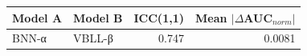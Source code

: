 \begin{tabular}{llrr}
\toprule
\textbf{Model A} & \textbf{Model B} & \textbf{ICC(1,1)} & \textbf{Mean $|\Delta$AUC$_{norm}|$} \\
\midrule
BNN-α & VBLL-β & 0.747 & 0.0081 \\
\bottomrule
\end{tabular}
